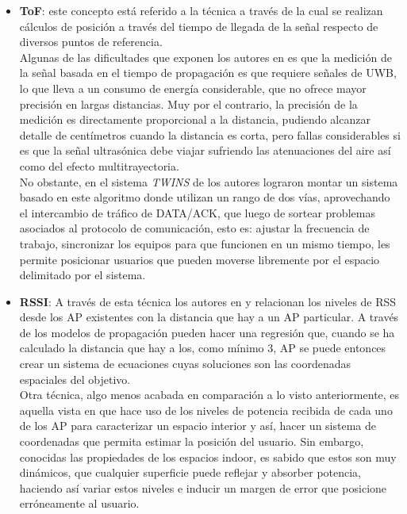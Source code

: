 \begin{enumerate}
{    \begin{itemize}
        \item{\textbf{\ac{ToF}}: este concepto está referido a la técnica a través de la cual se realizan cálculos de posición a través del tiempo de llegada de la señal respecto de diversos puntos de referencia.\cite{5}\\
            
        Algunas de las dificultades que exponen los autores en \cite{22} es que la medición de la señal basada en el  tiempo de propagación es que requiere señales de \ac{UWB}, lo que lleva a un consumo de energía considerable, que no ofrece mayor precisión en largas distancias. Muy por el contrario, la precisión de la medición es directamente proporcional a la distancia, pudiendo alcanzar detalle de centímetros cuando la distancia es corta, pero fallas considerables si es que la señal ultrasónica debe viajar sufriendo las atenuaciones del aire así como del efecto multitrayectoria.\\
            
        No obstante, en el sistema \textit{TWINS} de \cite{2} los autores lograron montar un sistema basado en este algoritmo donde utilizan un rango de dos vías, aprovechando el intercambio de tráfico de DATA/ACK, que luego de sortear problemas asociados al protocolo de comunicación, esto es:  ajustar la frecuencia de trabajo, sincronizar los equipos para que funcionen en un mismo tiempo, les permite posicionar usuarios que pueden moverse libremente por el espacio delimitado por el sistema.}\\
        
        \item{\textbf{\ac{RSSI}}: A través de esta técnica los autores en \cite{3} y \cite{4} relacionan los niveles de \ac{RSS} desde los \ac{AP} existentes con la distancia que hay a un AP particular. A través de los modelos de propagación pueden hacer una regresión que, cuando se ha calculado la distancia que hay a los, como mínimo 3, AP se puede entonces crear un sistema de ecuaciones cuyas soluciones son las coordenadas espaciales del objetivo.\\
        
        Otra técnica, algo menos acabada en comparación a lo visto anteriormente, es aquella vista en \cite{13} que hace uso de los niveles de potencia recibida de cada uno de los AP para caracterizar un espacio interior y así, hacer un sistema de coordenadas que permita estimar la posición del usuario. Sin embargo, conocidas las propiedades de los espacios indoor, es sabido que estos son muy dinámicos, que cualquier superficie puede reflejar y absorber potencia, haciendo así variar estos niveles e inducir un margen de error que posicione erróneamente al usuario.\\
        
}
\end{itemize}}
\end{enumerate}
